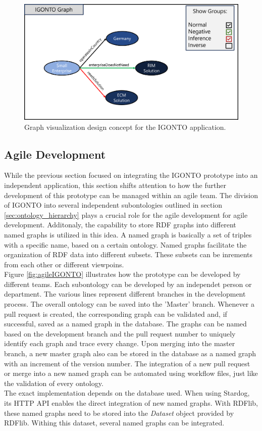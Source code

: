 \documentclass[
  a4paper,  %
  twoside,  %
  bibliography=totoc,
  headsepline,
  cleardoublepage=empty,
  parskip=half,
  draft=false
]{scrbook}
\begin{document}
\begin{figure}
\centering
\includegraphics[width=\textwidth]{graphics/graphDesign.png}
\caption{Graph visualization design concept for the IGONTO application.}
\label{fig:visualizationDesign}
\end{figure}

\subsection{Agile Development}

While the previous section focused on integrating the IGONTO prototype into an independent application, this section shifts attention to how the further development of this prototype can be managed within an agile team. The division of IGONTO into several independent subontologies outlined in section \ref{sec:ontology_hierarchy} plays a crucial role for the agile development for agile development. Additonaly, the capability to store RDF graphs into different named graphs is utilized in this idea. A named graph is basically a set of triples with a specific name, based on a certain ontology. Named graphs facilitate the organization of RDF data into different subsets. These subsets can be inrements from each other or different viewpoins.\\
Figure \ref{fig:agileIGONTO} illustrates how the prototype can be developed by different teams. Each subontology can be developed by an independet person or department. The various lines represent different branches in the development process. The overall ontology can be saved into the 'Master' branch. Whenever a pull request is created, the corresponding graph can be validated and, if successful, saved as a named graph in the database. The graphs can be named based on the development branch and the pull request number to uniquely identify each graph and trace every change. Upon merging into the master branch, a new master graph also can be stored in the database as a named graph with an increment of the version number. The integration of a new pull request or merge into a new named graph can be automated using workflow files, just like the validation of every ontology. \\
The exact implementation depends on the database used. When using Stardog, its HTTP API enables the direct integration of new named graphs. With RDFlib, these named graphs need to be stored into the \textit{Dataset} object provided by RDFlib. Withing this dataset, several named graphs can be integrated. \\
\end{document}

